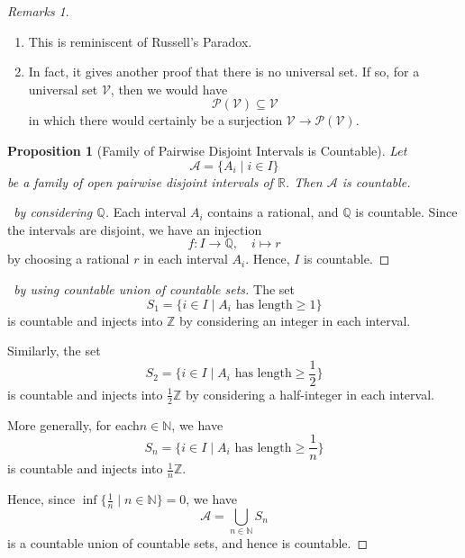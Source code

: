 \documentclass{article}
\newtheorem{proposition}[theorem]{Proposition}
\theoremstyle{definition}
\theoremstyle{remark}
\newtheorem{remarks}[theorem]{Remarks}
\newcommand{\pqty}[1]{\left(#1\right)}
\newcommand{\set}[2]{\{#1\mid #2\}}
\newcommand{\function}[5]{#1:#2\to #3,\quad #4\mapsto #5}
\newcommand{\powerset}{\mathcal{P}}
\newcommand{\NN}{\mathbb{N}}
\newcommand{\ZZ}{\mathbb{Z}}
\newcommand{\QQ}{\mathbb{Q}}
\newcommand{\RR}{\mathbb{R}}
\begin{document}
\begin{remarks}
    \begin{enumerate}
        \item This is reminiscent of Russell's Paradox.
        \item In fact, it gives another proof that there is no universal set. If so, for a universal set \(\mathcal{V}\), then we would have
        \[
            \powerset\pqty{\mathcal{V}} \subseteq \mathcal{V}
        \]
        in which there would certainly be a surjection \(\mathcal{V} \to \powerset\pqty{\mathcal{V}}\).
    \end{enumerate}
\end{remarks}

\begin{proposition}[Family of Pairwise Disjoint Intervals is Countable]
    Let
    \[
        \mathcal{A} = \set{A_i}{i \in I}
    \]
    be a family of open pairwise disjoint intervals of \(\RR\). Then \(\mathcal{A}\) is countable.
\end{proposition}

\begin{proof}[\proofname\ by considering \(\QQ\)]
    Each interval \(A_i\) contains a rational, and \(\QQ\) is countable. Since the intervals are disjoint, we have an injection
    \[
        \function{f}{I}{\QQ}{i}{r}
    \]
    by choosing a rational \(r\) in each interval \(A_i\). Hence, \(I\) is countable.
\end{proof}

\begin{proof}[\proofname\ by using countable union of countable sets]
    The set
    \[
        S_1 = \set{i \in I}{A_i \text{ has length} \geq 1}
    \]
    is countable and injects into \(\ZZ\) by considering an integer in each interval.

    Similarly, the set
    \[
        S_2 = \set{i \in I}{A_i \text{ has length} \geq \frac{1}{2}}
    \]
    is countable and injects into \(\frac{1}{2} \ZZ\) by considering a half-integer in each interval.

    More generally, for each\(n \in \NN\), we have
    \[
        S_n = \set{i \in I}{A_i \text{ has length} \geq \frac{1}{n}}
    \]
    is countable and injects into \(\frac{1}{n} \ZZ\).

    Hence, since \(\inf \set{\frac{1}{n}}{n \in \NN} = 0\), we have
    \[
        \mathcal{A} = \bigcup_{n \in \NN} S_n
    \]
    is a countable union of countable sets, and hence is countable.
\end{proof}
\end{document}

